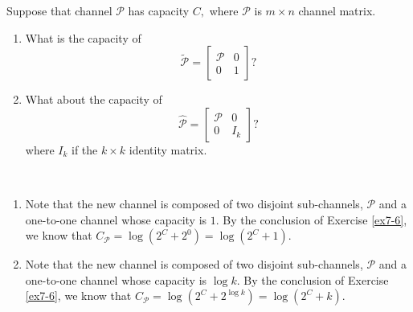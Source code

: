 \begin{exercise}[Capacity]{Suppose that channel $\mathcal{P}$ has capacity $C,$ where $\mathcal{P}$ is $m \times n$ channel matrix.
  \begin{enumerate}
    \item What is the capacity of
    $$
    \tilde{\mathcal{P}}=\left[\begin{array}{ll}
    \mathcal{P} & 0 \\
    0 & 1
    \end{array}\right] ?
    $$
    \item  What about the capacity of
    $$
    \hat{\mathcal{P}}=\left[\begin{array}{cc}
    \mathcal{P} & 0 \\
    0 & I_{k}
    \end{array}\right] ?
    $$
    where $I_{k}$ if the $k \times k$ identity matrix.
  \end{enumerate} }
  \begin{solution}
  \par{~}
  \begin{enumerate}
    \item { Note that the new channel is composed of two disjoint sub-channels, $\mathcal{P}$ and a one-to-one channel whose capacity is $1$. By the conclusion of Exercise \ref{ex7-6}, we know that $C_{\mathcal{P}} = \log (2^{C} + 2^{0}) = \log (2^{C} + 1)$. }
    \item { Note that the new channel is composed of two disjoint sub-channels, $\mathcal{P}$ and a one-to-one channel whose capacity is $\log k$. By the conclusion of Exercise \ref{ex7-6}, we know that $C_{\mathcal{P}} = \log (2^{C} + 2^{\log k}) = \log (2^{C} + k)$. }
  \end{enumerate}
  \end{solution}
  \label{ex7-7}
\end{exercise}

